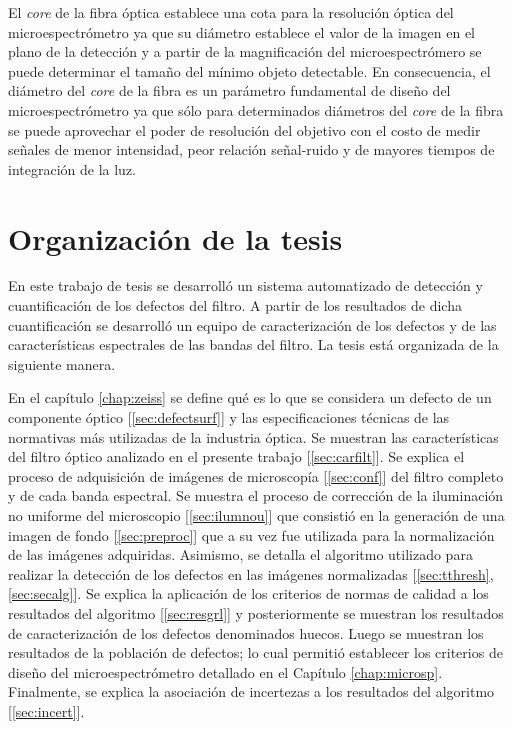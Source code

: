 El \textit{core} de la fibra óptica establece una cota para la resolución óptica del microespectrómetro ya que su diámetro establece el valor de la imagen en el plano de la detección y a partir de la magnificación del microespectrómero se puede determinar el tamaño del mínimo objeto detectable. En consecuencia, el diámetro del \textit{core} de la fibra es un parámetro fundamental de diseño del microespectrómetro ya que sólo para determinados diámetros del \textit{core} de la fibra se puede aprovechar el poder de resolución del objetivo con el costo de medir señales de menor intensidad, peor relación señal-ruido y de mayores tiempos de integración de la luz.


\singlespacing
\section{Organización de la tesis}

\hspace{0.5cm}En este trabajo de tesis se desarrolló un sistema automatizado de detección y cuantificación de los defectos del filtro. A partir de los resultados de dicha cuantificación se desarrolló un equipo de caracterización de los defectos y de las características espectrales de las bandas del filtro. La tesis está organizada de la siguiente manera.

En el capítulo \ref{chap:zeiss} se define qué es lo que se considera un defecto de un componente óptico [\ref{sec:defectsurf}] y las especificaciones técnicas de las normativas más utilizadas de la industria óptica. Se muestran las características del filtro óptico analizado en el presente trabajo [\ref{sec:carfilt}]. Se explica el proceso de adquisición de imágenes de microscopía [\ref{sec:conf}] del filtro completo y de cada banda espectral. Se muestra el proceso de corrección de la iluminación no uniforme del microscopio [\ref{sec:ilumnou}]  que consistió en la generación de una imagen de fondo [\ref{sec:preproc}] que a su vez fue utilizada para la normalización de las imágenes adquiridas. Asimismo, se detalla el algoritmo utilizado para realizar la detección de los defectos en las imágenes normalizadas [\ref{sec:tthresh},\ref{sec:secalg}]. Se explica la aplicación de los criterios de normas de calidad a los resultados del algoritmo [\ref{sec:resgrl}] y posteriormente se muestran los resultados de caracterización de los defectos denominados huecos. Luego se muestran los resultados de la población de defectos; lo cual permitió establecer los criterios de diseño del microespectrómetro detallado en el Capítulo \ref{chap:microsp}. Finalmente, se explica la asociación de incertezas a los resultados del algoritmo [\ref{sec:incert}].


